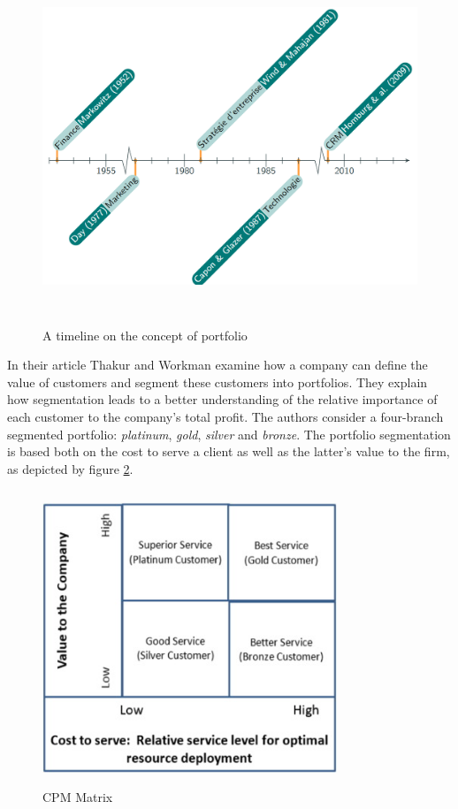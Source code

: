 \documentclass[
]{book}
\begin{document}
\begin{figure}

{\centering \includegraphics[width=400pt,height=300pt]{./imgs/portfolio_timeline} 

}

\caption{A timeline on the concept of portfolio}\label{fig:timeline}
\end{figure}

In their article Thakur and Workman examine how a company can define the
value of customers and segment these customers into portfolios. They explain how segmentation leads to a better understanding of the relative importance of each customer to the company's total profit. The authors consider a four-branch segmented portfolio: \emph{platinum}, \emph{gold}, \emph{silver} and \emph{bronze}. The portfolio segmentation is based both on the cost to serve a client as well as the latter's value to the firm, as depicted by figure \ref{fig:cpmmat}.

\begin{figure}

{\centering \includegraphics[width=250pt,height=250pt]{./imgs/cpm_matrix} 

}

\caption{CPM Matrix}\label{fig:cpmmat}
\end{figure}
\end{document}
